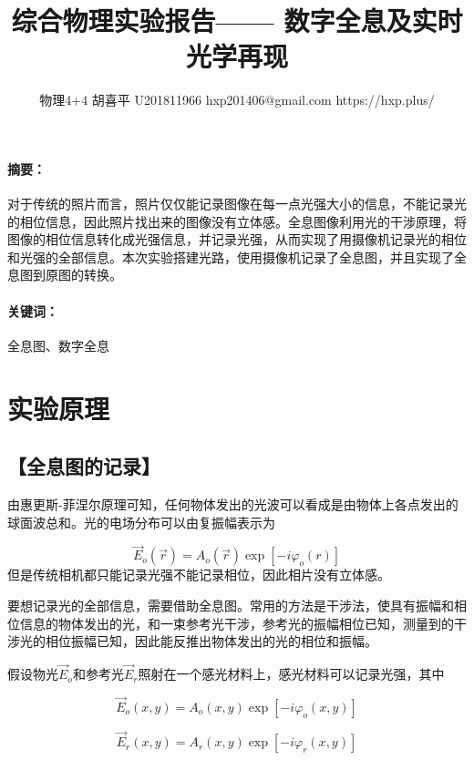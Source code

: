 \documentclass{ctexart}
\date{}
\newcommand{\generatetitle}[6]{\title{\zihao{3}\heiti#1} \author{#2 \quad
    \quad #3 \quad\quad #4 \quad\quad #5 \quad\quad #6} \maketitle\thispagestyle{fancy}}
\let\oldsubsection\subsection
\renewcommand{\subsection}[1]{\oldsubsection{\!\!\!\!\!\!【#1】}}
\let\oldparagraph\paragraph
\renewcommand{\paragraph}[1]{\oldparagraph{#1：\!\!\!\!\!\!}}
\begin{document}
\generatetitle{综合物理实验报告——
  数字全息及实时光学再现}{物理4+4}{胡喜平}{U201811966}{hxp201406@gmail.com}{https://hxp.plus/}

\paragraph{摘要}
对于传统的照片而言，照片仅仅能记录图像在每一点光强大小的信息，不能记录光的相位信息，因此照片找出来的图像没有立体感。全息图像利用光的干涉原理，将图像的相位信息转化成光强信息，并记录光强，从而实现了用摄像机记录光的相位和光强的全部信息。本次实验搭建光路，使用摄像机记录了全息图，并且实现了全息图到原图的转换。

\paragraph{关键词}
全息图、数字全息

\section{实验原理}

\subsection{全息图的记录}

由惠更斯-菲涅尔原理可知，任何物体发出的光波可以看成是由物体上各点发出的球面波总和。光的电场分布可以由复振幅表示为

\begin{equation}
  \vec{E}_o \left( \vec{r} \right) = A_o \left( \vec{r} \right)  \exp \left[ - i \varphi_o \left( r \right) \right]
\end{equation}
但是传统相机都只能记录光强不能记录相位，因此相片没有立体感。

要想记录光的全部信息，需要借助全息图。常用的方法是干涉法，使具有振幅和相位信息的物体发出的光，和一束参考光干涉，参考光的振幅相位已知，测量到的干涉光的相位振幅已知，因此能反推出物体发出的光的相位和振幅。

假设物光$\vec{E}_o$和参考光$\vec{E}_r$照射在一个感光材料上，感光材料可以记录光强，其中

\begin{equation}
  \label{eq:物光}
  \vec{E}_o \left( x, y \right) = A_o \left( x, y \right) \exp \left[ - i \varphi_o \left( x, y \right) \right]
\end{equation} 

\begin{equation}
  \label{eq:参考光}
  \vec{E}_r \left( x, y \right) = A_r \left( x, y \right) \exp \left[ - i \varphi_r \left( x, y \right) \right]
\end{equation}
\end{document}

